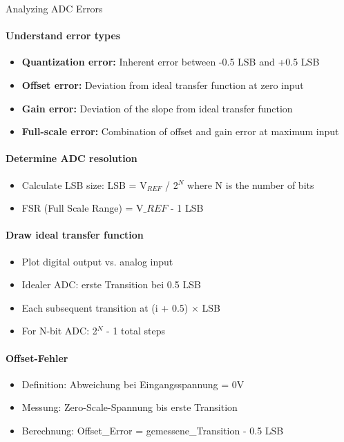 \begin{KR}{Analyzing ADC Errors}
\paragraph{Understand error types}
\begin{itemize}
    \item \textbf{Quantization error:} Inherent error between -0.5 LSB and +0.5 LSB
    \item \textbf{Offset error:} Deviation from ideal transfer function at zero input
    \item \textbf{Gain error:} Deviation of the slope from ideal transfer function
    \item \textbf{Full-scale error:} Combination of offset and gain error at maximum input
\end{itemize}

\paragraph{Determine ADC resolution}
\begin{itemize}
    \item Calculate LSB size: LSB = V$_{REF}$ / 2$^N$ where N is the number of bits
    \item FSR (Full Scale Range) = V$\_{REF}$ - 1 LSB
\end{itemize}

\paragraph{Draw ideal transfer function}
\begin{itemize}
    \item Plot digital output vs. analog input
    \item Idealer ADC: erste Transition bei 0.5 LSB
    \item Each subsequent transition at (i + 0.5) × LSB
    \item For N-bit ADC: 2$^N$ - 1 total steps
\end{itemize}

\paragraph{Offset-Fehler}
    \begin{itemize}
        \item Definition: Abweichung bei Eingangsspannung = 0V
        \item Messung: Zero-Scale-Spannung bis erste Transition
        \item Berechnung: Offset\_Error = gemessene\_Transition - 0.5 LSB
    \end{itemize}


\end{KR}
